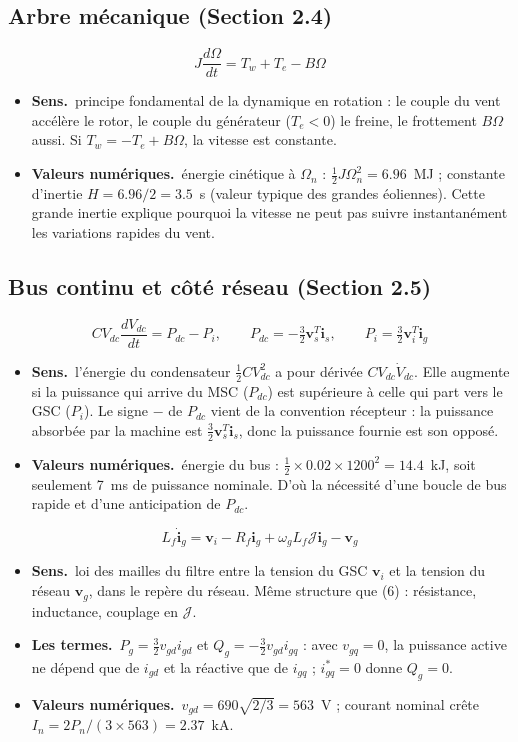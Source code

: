 \documentclass[11pt,a4paper]{article}
\newcommand{\bv}[1]{\mathbf{#1}}
\newcommand{\Jm}{\boldsymbol{\mathcal{J}}}
\newenvironment{expl}{\begin{itemize}[leftmargin=1.2em,itemsep=2pt,topsep=2pt]}{\end{itemize}}
\newcommand{\sens}{\item \textbf{Sens.}~}
\newcommand{\termes}{\item \textbf{Les termes.}~}
\newcommand{\num}{\item \textbf{Valeurs numériques.}~}
\begin{document}
\subsection{Arbre mécanique (Section 2.4)}
\begin{equation}\tag{7}
J\frac{d\Omega}{dt} = T_w + T_e - B\Omega
\end{equation}
\begin{expl}
\sens principe fondamental de la dynamique en rotation : le couple du vent accélère le rotor, le couple
du générateur ($T_e<0$) le freine, le frottement $B\Omega$ aussi. Si $T_w=-T_e+B\Omega$, la vitesse est
constante.
\num énergie cinétique à $\Omega_n$ : $\frac12J\Omega_n^2=6.96$~MJ ; constante d'inertie
$H=6.96/2=3.5$~s (valeur typique des grandes éoliennes). Cette grande inertie explique pourquoi la
vitesse ne peut pas suivre instantanément les variations rapides du vent.
\end{expl}

\subsection{Bus continu et côté réseau (Section 2.5)}
\begin{equation}\tag{8}
CV_{dc}\frac{dV_{dc}}{dt} = P_{dc} - P_i,\qquad P_{dc}=-\tfrac32\bv{v}_s^T\bv{i}_s,\qquad
P_i=\tfrac32\bv{v}_i^T\bv{i}_g
\end{equation}
\begin{expl}
\sens l'énergie du condensateur $\frac12CV_{dc}^2$ a pour dérivée $CV_{dc}\dot V_{dc}$. Elle augmente si la
puissance qui arrive du MSC ($P_{dc}$) est supérieure à celle qui part vers le GSC ($P_i$). Le signe $-$ de
$P_{dc}$ vient de la convention récepteur : la puissance absorbée par la machine est
$\frac32\bv v_s^T\bv i_s$, donc la puissance fournie est son opposé.
\num énergie du bus : $\frac12\times0.02\times1200^2=14.4$~kJ, soit seulement 7~ms de puissance
nominale. D'où la nécessité d'une boucle de bus rapide et d'une anticipation de $P_{dc}$.
\end{expl}

\begin{equation}\tag{9}
L_f\dot{\bv{i}}_g = \bv{v}_i - R_f\bv{i}_g + \omega_gL_f\Jm\bv{i}_g - \bv{v}_g
\end{equation}
\begin{expl}
\sens loi des mailles du filtre entre la tension du GSC $\bv v_i$ et la tension du réseau $\bv v_g$, dans
le repère du réseau. Même structure que (6) : résistance, inductance, couplage en $\Jm$.
\termes $P_g=\frac32v_{gd}i_{gd}$ et $Q_g=-\frac32v_{gd}i_{gq}$ : avec $v_{gq}=0$, la puissance active ne
dépend que de $i_{gd}$ et la réactive que de $i_{gq}$ ; $i_{gq}^*=0$ donne $Q_g=0$.
\num $v_{gd}=690\sqrt{2/3}=563$~V ; courant nominal crête $I_n=2P_n/(3\times563)=2.37$~kA.
\end{expl}
\end{document}
